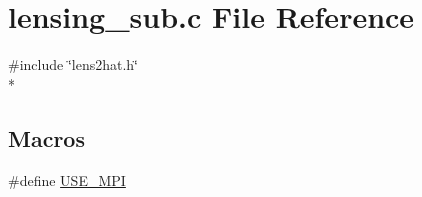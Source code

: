 \section{lensing\-\_\-sub.\-c File Reference}
\label{derivatives__nersc_2lensing__sub_8c}
{\ttfamily \#include \char`\"{}lens2hat.\-h\char`\"{}}\\*
\subsection*{Macros}
\begin{DoxyCompactItemize}
\item 
\#define \hyperlink{derivatives__nersc_2lensing__sub_8c_a3869d282031f6ea6b50fdb980b758420}{U\-S\-E\-\_\-\-M\-P\-I}
\end{DoxyCompactItemize}
